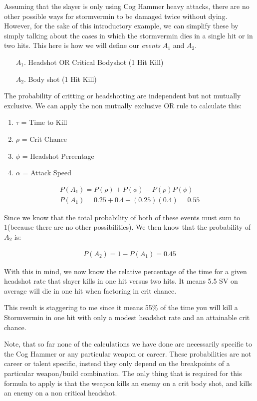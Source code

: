 \documentclass{article}
\begin{document}
Assuming that the slayer is only using Cog Hammer heavy attacks, there are no other possible ways for stormvermin to be damaged twice without dying. However, for the sake of this introductory example, we can simplify these by simply talking about the cases in which the stormvermin dies in a single hit or in two hits. This here is how we will define our \emph{events} $A_1$ and $A_2$.

\begin{enumerate}
\item[$A_1$.] Headshot OR Critical Bodyshot (1 Hit Kill)
\item[$A_2$.] Body shot (1 Hit Kill)
\end{enumerate}

The probability of critting or headshotting are independent but not mutually exclusive. We can apply the non mutually exclusive OR rule to calculate this:

\begin{enumerate}
\item $\tau$ = Time to Kill
\item $\rho$ = Crit Chance
\item $\phi$ = Headshot Percentage
\item $\alpha$ = Attack Speed
\end{enumerate}
\begin{align*}
P(A_1) = P(\rho) + P(\phi) - P(\rho)P(\phi) \\
P(A_1) = 0.25 + 0.4 - (0.25)(0.4) = 0.55
\end{align*}

Since we know that the total probability of both of these events must sum to 1(because there are no other possibilities). We then know that the probability of $A_2$ is:

\begin{align*}
P(A_2) = 1-P(A_1) = 0.45
\end{align*}

With this in mind, we now know the relative percentage of the time for a given headshot rate that  slayer kills in one hit versus two hits. It means 5.5 SV on average will die in one hit when factoring in crit chance.

This result is staggering to me since it means 55\% of the time you will kill a Stormvermin in one hit with only a modest headshot rate and an attainable crit chance.

Note, that so far none of the calculations we have done are necessarily specific to the Cog Hammer or any particular weapon or career. These probabilities are not career or talent specific, instead they only depend on the breakpoints of a particular weapon/build combination. The only thing that is required for this formula to apply is that the weapon kills an enemy on a crit body shot, and kills an enemy on a non critical headshot.
\end{document}
